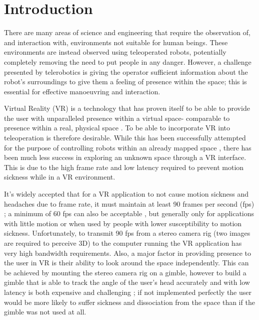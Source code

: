 \chapter{Introduction}

There are many areas of science and engineering that require the observation of, and interaction with, environments not suitable for human beings. These environments are instead observed using teleoperated robots, potentially completely removing the need to put people in any danger. However, a challenge presented by telerobotics is giving the operator sufficient information about the robot's surroundings to give them a feeling of presence \cite{presence} within the space; this is essential for effective manoeuvring and interaction.

Virtual Reality (VR) is a technology that has proven itself to be able to provide the user with unparalleled presence within a virtual space- comparable to presence within a real, physical space \cite{loomis2016presence,McGlynn}. To be able to incorporate VR into teleoperation is therefore desirable. While this has been successfully attempted for the purpose of controlling robots within an already mapped space \cite{bounds2016integrated}, there has been much less success in exploring an unknown space through a VR interface. This is due to the high frame rate and low latency required to prevent motion sickness while in a VR environment.

It's widely accepted that for a VR application to not cause motion sickness and headaches due to frame rate, it must maintain at least 90 frames per second (fps) \cite{FrameRate}; a minimum of 60 fps can also be acceptable \cite{Borg2013UsingAG}, but generally only for applications with little motion or when used by people with lower susceptibility to motion sickness. Unfortunately, to transmit 90 fps from a stereo camera rig (two images are required to perceive 3D) to the computer running the VR application has very high bandwidth requirements. Also, a major factor in providing presence to the user in VR is their ability to look around the space independently. This can be achieved by mounting the stereo camera rig on a gimble, however to build a gimble that is able to track the angle of the user's head accurately and with low latency is both expensive and challenging \cite{DORA}; if not implemented perfectly the user would be more likely to suffer sickness and dissociation from the space than if the gimble was not used at all.

